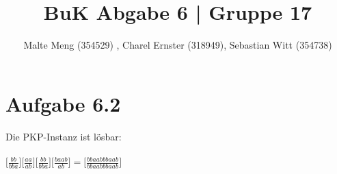 \documentclass{article}
\title{BuK Abgabe 6 | Gruppe 17}
\author{Malte Meng (354529) , Charel Ernster (318949), Sebastian Witt (354738)}
\begin{document}
	\maketitle 
	\section[a 6.2]{Aufgabe 6.2}
	Die PKP-Instanz ist lösbar:\\\\
	$
	\Big[ \frac{bb}{bba} \Big]
	\Big[ \frac{aa}{ab} \Big]
	\Big[ \frac{bb}{bba} \Big]
	\Big[ \frac{baab}{ab} \Big]
	=
	\Big[ \frac{bbaabbbaab}{bbaabbbaab}\Big]
	$\\
\end{document}
